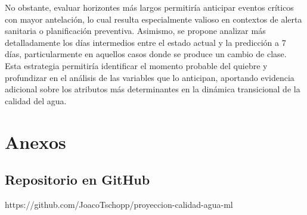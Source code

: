 \documentclass[
  11pt,
  pdftitle=TFI - Tschopp Joaquín S.,
  pdfauthor=Tschopp Joaquín S.,
  pdfcreator=LaTeX with hyperref,
]{report}  %
\begin{document}
No obstante, evaluar horizontes más largos permitiría anticipar eventos críticos con mayor antelación, lo cual resulta especialmente valioso en contextos de alerta sanitaria o planificación preventiva. Asimismo, se propone analizar más detalladamente los días intermedios entre el estado actual y la predicción a 7 días, particularmente en aquellos casos donde se produce un cambio de clase. Esta estrategia permitiría identificar el momento probable del quiebre y profundizar en el análisis de las variables que lo anticipan, aportando evidencia adicional sobre los atributos más determinantes en la dinámica transicional de la calidad del agua.


\cleardoublepage






\appendix
\chapter{Anexos}
\section{Repositorio en GitHub}

https://github.com/JoacoTschopp/proyeccion-calidad-agua-ml
\end{document}

